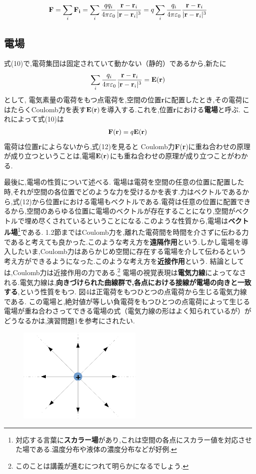 \documentclass{jsarticle}
\begin{document}
\begin{eqnarray}
{\bf F}=\sum^{}_{i}{\bf F_{i}}=\sum^{}_{i}\frac{qq_{i}}{4\pi \varepsilon_{0}}\frac{{\bf r}-{\bf r}_i}{|{\bf r}-{\bf r}_i|^3}
=q\sum^{}_{i}\frac{q_{i}}{4\pi \varepsilon_{0}}\frac{{\bf r}-{\bf r}_i}{|{\bf r}-{\bf r}_i|^3}
\end{eqnarray}

\subsection{電場}

式(10)で,電荷集団は固定されていて動かない（静的）であるから,新たに
\begin{eqnarray}
\sum^{}_{i}\frac{q_{i}}{4\pi \varepsilon_{0}}\frac{{\bf r}-{\bf r}_i}{|{\bf r}-{\bf r}_i|^3} = {\bf E}({\bf r})
\end{eqnarray}
として, 電気素量の電荷をもつ点電荷を,空間の位置{\bf r}に配置したとき,その電荷にはたらくCoulomb力を表す${\bf E}({\bf r})$を導入する.これを,位置{\bf r}における{\bf 電場}と呼ぶ.
これによって式(10)は
\begin{eqnarray}
{\bf F}({\bf r})= q{\bf E}({\bf r})
\end{eqnarray}
電荷は位置{\bf r}によらないから,式(12)を見ると
Coulomb力{\bf F}({\bf r})に重ね合わせの原理が成り立つということは,電場${\bf E}({\bf r})$にも重ね合わせの原理が成り立つことがわかる.

最後に,電場の性質について述べる.
電場は電荷を空間の任意の位置に配置した時,それが空間の各位置でどのような力を受けるかを表す.力はベクトルであるから,式(12)から位置{\bf r}における電場もベクトルである.電荷は任意の位置に配置できるから,空間のあらゆる位置に電場のベクトルが存在することになり,空間がベクトルで埋め尽くされているということになる.このような性質から,電場は{\bf ベクトル場}\footnote{対応する言葉に{\bf スカラー場}があり,これは空間の各点にスカラー値を対応させた場である.温度分布や液体の濃度分布などが好例.}である.
1.2節まではCoulomb力を,離れた電荷間を時間を介さずに伝わる力であると考えても良かった.このような考え方を{\bf 遠隔作用}という.しかし電場を導入したいま,Coulomb力はあらかじめ空間に存在する電場を介して伝わるという考え方ができるようになった.このような考え方を{\bf 近接作用}という.
結論としては,Coulomb力は近接作用の力である.\footnote{このことは講義が進むにつれて明らかになるでしょう.}
電場の視覚表現は{\bf 電気力線}によってなされる.電気力線は,{\bf 向きづけられた曲線群で,各点における接線が電場の向きと一致する},という性質をもつ.
図4は正電荷をもつひとつの点電荷から生じる電気力線である.
この電場と,絶対値が等しい負電荷をもつひとつの点電荷によって生じる電場が重ね合わさってできる電場の式（電気力線の形はよく知られているが）がどうなるかは,演習問題1を参考にされたい.

\begin{figure}[htbp]
 \begin{center}
  \includegraphics[width=60mm]{1.4.eps}
 \end{center}
 \caption{}
 \label{fig:one}
\end{figure}
\end{document}
